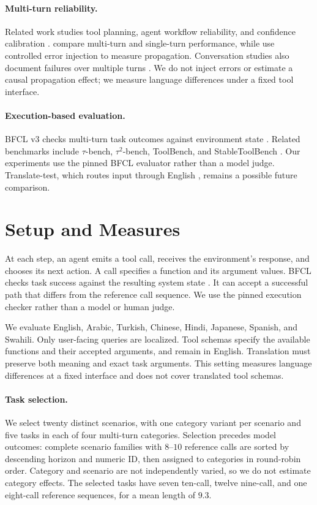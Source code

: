 \documentclass[11pt]{article}
\begin{document}
\paragraph{Multi-turn reliability.} Related work studies tool planning,
agent workflow reliability, and confidence calibration
\citep{denoiseflow2026,phgpo2026,htc2026}.
\citet{turnwise2026} compare multi-turn and single-turn performance, while
\citet{agentprop2026} use controlled error injection to measure propagation.
Conversation studies also document failures over multiple turns
\citep{laban2025lostinconversation}. We do not inject errors or estimate a
causal propagation effect; we measure language differences under a fixed
tool interface.

\paragraph{Execution-based evaluation.} BFCL v3 checks multi-turn task
outcomes against environment state \citep{patil2025bfcl}. Related benchmarks
include $\tau$-bench, $\tau^2$-bench, ToolBench, and StableToolBench
\citep{yao2025taubench,barres2025tau2,qin2024toolbench,guo2024stabletoolbench}.
Our experiments use the pinned BFCL evaluator rather than a model judge.
Translate-test, which routes input through English
\citep{shi2022language}, remains a possible future comparison.

\section{Setup and Measures}
\label{sec:setup}

At each step, an agent emits a tool call, receives the environment's response,
and chooses its next action. A call specifies a function and its argument
values. BFCL checks task success against the resulting
system state \citep{patil2025bfcl}. It can accept a successful path that differs
from the reference call sequence. We use the pinned execution checker rather
than a model or human judge.

We evaluate English, Arabic, Turkish, Chinese, Hindi, Japanese, Spanish, and
Swahili. Only user-facing queries are localized. Tool schemas specify the
available functions and their accepted arguments, and remain in English.
Translation must preserve both meaning and exact task arguments.
This setting measures language differences at a fixed interface and does not
cover translated tool schemas.

\paragraph{Task selection.} We select twenty distinct scenarios, with one
category variant per scenario and five tasks in each of four multi-turn
categories. Selection precedes model outcomes: complete scenario families
with $8$--$10$ reference calls are sorted by descending horizon and numeric
ID, then assigned to categories in round-robin order. Category and scenario
are not independently varied, so we do not estimate category effects.
The selected tasks have seven ten-call, twelve nine-call, and one eight-call
reference sequences, for a mean length of $9.3$.
\end{document}
